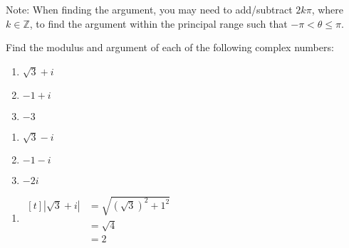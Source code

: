 \documentclass[11pt,a4paper]{book}
\newcommand{\Z}{\mathbb{Z}}
\begin{document}
Note: When finding the argument, you may need to add/subtract $2k\pi$, where $k\in\Z$, to find
the argument within the principal range such that $-\pi<\theta\leq\pi$.

\begin{example}

Find the modulus and argument of each of the following complex numbers:

\begin{minipage}[t]{0.5\textwidth}

\begin{enumerate}[label=(\alph*)]

\item  $\sqrt{3}+i$

\addtocounter{enumi}{1}

\item  $-1+i$

\addtocounter{enumi}{1}

\item  $-3$

\end{enumerate}

\end{minipage}
\begin{minipage}[t]{0.5\textwidth}

\begin{enumerate}[label=(\alph*),start=2]

\item  $\sqrt{3}-i$

\addtocounter{enumi}{1}

\item  $-1-i$

\addtocounter{enumi}{1}

\item  $-2i$

\addtocounter{enumi}{1}

\end{enumerate}

\end{minipage}

\medskip{}

\Solution

\begin{enumerate}[label=(\alph*)]

\item

\begin{minipage}[t]{0.3\textwidth}
$
\begin{aligned}[t]
\left|\sqrt{3}+i\right| & =\sqrt{\left(\sqrt{3}\right)^{2}+1^{2}}\\
 & =\sqrt{4}\\
 & =2
\end{aligned}
$


\end{minipage}
\end{enumerate}
\end{example}
\end{document}
